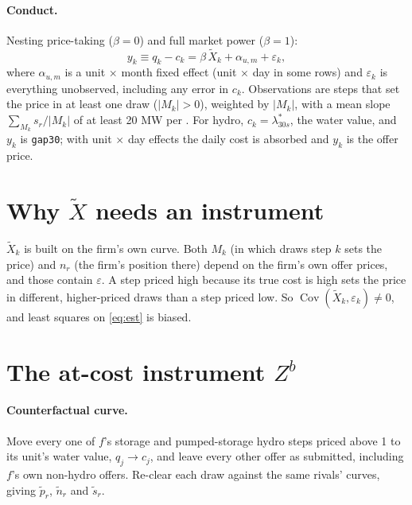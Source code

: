 \documentclass[11pt]{article}
\newcommand{\Xt}{\tilde X}
\newcommand{\eur}{\text{\texteuro}}
\newcommand{\code}[1]{\texttt{\small #1}}
\begin{document}
\paragraph{Conduct.} Nesting price-taking ($\beta=0$) and full market power ($\beta=1$):
\begin{equation}\label{eq:est}
  y_k \equiv q_k - c_k = \beta\,\Xt_k + \alpha_{u,m} + \varepsilon_k ,
\end{equation}
where $\alpha_{u,m}$ is a unit $\times$ month fixed effect (unit $\times$ day in some rows) and
$\varepsilon_k$ is everything unobserved, including any error in $c_k$. Observations are steps
that set the price in at least one draw ($\lvert M_k\rvert > 0$), weighted by $\lvert M_k
\rvert$, with a mean slope $\sum_{M_k} s_r / \lvert M_k\rvert$ of at least 20 MW per \eur.
For hydro, $c_k = \lambda^*_{30s}$, the water value, and $y_k$ is \code{gap30}; with unit
$\times$ day effects the daily cost is absorbed and $y_k$ is the offer price.

\section{Why \texorpdfstring{$\Xt$}{X} needs an instrument}

$\Xt_k$ is built on the firm's own curve. Both $M_k$ (in which draws step $k$ sets the price)
and $n_r$ (the firm's position there) depend on the firm's own offer prices, and those
contain $\varepsilon$. A step priced high because its true cost is high sets the price in
different, higher-priced draws than a step priced low. So $\operatorname{Cov}(\Xt_k,
\varepsilon_k) \neq 0$, and least squares on \eqref{eq:est} is biased.

\section{The at-cost instrument \texorpdfstring{$Z^b$}{Zb}}

\paragraph{Counterfactual curve.} Move every one of $f$'s storage and pumped-storage hydro
steps priced above \eur1 to its unit's water value, $q_j \to c_j$, and leave every other
offer as submitted, including $f$'s own non-hydro offers. Re-clear each draw against the
same rivals' curves, giving $\tilde p_r$, $\tilde n_r$ and $\tilde s_r$.
\end{document}
